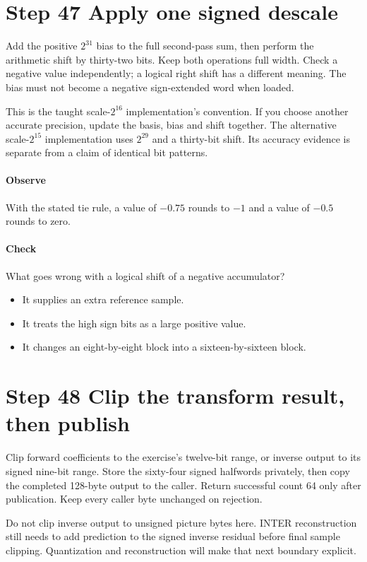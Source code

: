 \section{Step 47 Apply one signed descale}\label{h263-transform-s07}
Add the positive $2^{31}$ bias to the full second-pass sum, then perform the
arithmetic shift by thirty-two bits. Keep both operations full width. Check a
negative value independently; a logical right shift has a different meaning.
The bias must not become a negative sign-extended word when loaded.

This is the taught scale-$2^{16}$ implementation's convention. If you choose
another accurate precision, update the basis, bias and shift together. The
alternative scale-$2^{15}$ implementation uses $2^{29}$ and a thirty-bit shift.
Its accuracy evidence is separate from a claim of identical bit patterns.

\paragraph{Observe} With the stated tie rule, a value of $-0.75$ rounds to $-1$
and a value of $-0.5$ rounds to zero.
\paragraph{Check} What goes wrong with a logical shift of a negative accumulator?
\begin{itemize}
  \item[A.] It supplies an extra reference sample.
  \item[B.] It treats the high sign bits as a large positive value.
  \item[C.] It changes an eight-by-eight block into a sixteen-by-sixteen block.
\end{itemize}

\section{Step 48 Clip the transform result, then publish}\label{h263-transform-s08}
Clip forward coefficients to the exercise's twelve-bit range, or inverse output
to its signed nine-bit range. Store the sixty-four signed halfwords privately,
then copy the completed 128-byte output to the caller. Return successful count
64 only after publication. Keep every caller byte unchanged on rejection.

Do not clip inverse output to unsigned picture bytes here. INTER reconstruction
still needs to add prediction to the signed inverse residual before final sample
clipping. Quantization and reconstruction will make that next boundary explicit.

